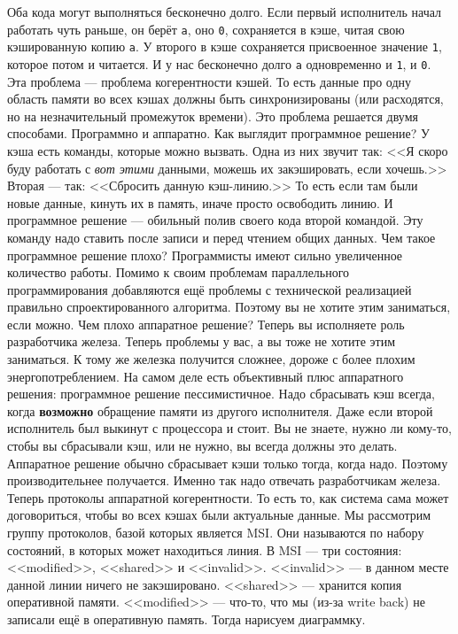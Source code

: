\documentclass{article}
\begin{document}
    Оба кода могут выполняться бесконечно долго. Если первый исполнитель начал работать чуть раньше, он берёт \texttt{a}, оно \texttt{0}, сохраняется в кэше, читая свою кэшированную копию \texttt{a}. У второго в кэше сохраняется присвоенное значение \texttt{1}, которое потом и читается. И у нас бесконечно долго \texttt{a} одновременно и \texttt{1}, и \texttt{0}. Эта проблема --- проблема когерентности кэшей. То есть данные про одну область памяти во всех кэшах должны быть синхронизированы (или расходятся, но на незначительный промежуток времени). Это проблема решается двумя способами. Программно и аппаратно. Как выглядит программное решение? У кэша есть команды, которые можно вызвать. Одна из них звучит так: <<Я скоро буду работать с \textit{вот этими} данными, можешь их закэшировать, если хочешь.>> Вторая --- так: <<Сбросить данную кэш-линию.>> То есть если там были новые данные, кинуть их в память, иначе просто освободить линию. И программное решение --- обильный полив своего кода второй командой. Эту команду надо ставить после записи и перед чтением общих данных. Чем такое программное решение плохо? Программисты имеют сильно увеличенное количество работы. Помимо к своим проблемам параллельного программирования добавляются ещё проблемы с технической реализацией правильно спроектированного алгоритма. Поэтому вы не хотите этим заниматься, если можно. Чем плохо аппаратное решение? Теперь вы исполняете роль разработчика железа. Теперь проблемы у вас, а вы тоже не хотите этим заниматься. К тому же железка получится сложнее, дороже с более плохим энергопотреблением. На самом деле есть объективный плюс аппаратного решения: программное решение пессимистичное. Надо сбрасывать кэш всегда, когда \textbf{возможно} обращение памяти из другого исполнителя. Даже если второй исполнитель был выкинут с процессора и стоит. Вы не знаете, нужно ли кому-то, стобы вы сбрасывали кэш, или не нужно, вы всегда должны это делать. Аппаратное решение обычно сбрасывает кэши только тогда, когда надо. Поэтому производительнее получается. Именно так надо отвечать разработчикам железа.\\
    Теперь протоколы аппаратной когерентности. То есть то, как система сама может договориться, чтобы во всех кэшах были актуальные данные. Мы рассмотрим группу протоколов, базой которых является MSI. Они называются по набору состояний, в которых может находиться линия. В MSI --- три состояния: <<modified>>, <<shared>> и <<invalid>>. <<invalid>> --- в данном месте данной линии ничего не закэшировано. <<shared>> --- хранится копия оперативной памяти. <<modified>> --- что-то, что мы (из-за write back) не записали ещё в оперативную память. Тогда нарисуем диаграммку.\\
\end{document}
